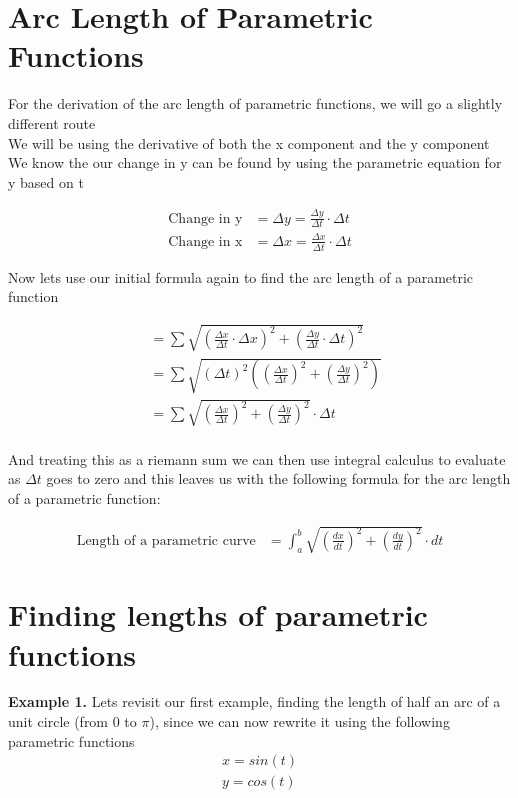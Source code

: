 \documentclass[12pt]{extarticle}
\begin{document}
\vspace{10cm}

\section{Arc Length of Parametric Functions}

For the derivation of the arc length of parametric functions, we will go a slightly different route \\
We will be using the derivative of both the x component and the y component \\ We know the our change in y can be found by using the parametric equation for y based on t 

\begin{align} 
    \text{Change in y} &= \Delta y = \frac{\Delta y}{\Delta t} \cdot \Delta t \\
    \text{Change in x} &= \Delta x = \frac{\Delta x}{\Delta t} \cdot \Delta t  
\end{align}

Now lets use our initial formula again to find the arc length of a parametric function


\begin{align} 
    &= \sum \sqrt{(\frac{\Delta x}{\Delta t} \cdot \Delta x)^2 + (\frac{\Delta y}{\Delta t} \cdot \Delta t) ^ 2} \\ 
    &= \sum \sqrt{(\Delta t)^2((\frac{\Delta x}{\Delta t})^2 + (\frac{\Delta y}{\Delta t}) ^ 2)} \\ 
    &= \sum \sqrt{(\frac{\Delta x}{\Delta t})^2 + (\frac{\Delta y}{\Delta t}) ^ 2} \cdot \Delta t \\ 
\end{align}

And treating this as a riemann sum we can then use integral calculus to evaluate as $\Delta t$ goes to zero and this leaves us with the following formula for the arc length of a parametric function:

\begin{align} 
    \text{Length of a parametric curve} &= \int_{a}^{b} \sqrt{(\frac{dx}{dt})^2 + (\frac{dy}{dt}) ^ 2} \cdot dt  
\end{align}

\section{Finding lengths of parametric functions}

\textbf{Example 1.} Lets revisit our first example, finding the length of half an arc of a unit circle (from $0$ to $\pi$), since we can now rewrite it using the following parametric functions
\begin{align} 
    x = sin(t) \\ 
    y = cos(t) 
\end{align}
\end{document}
